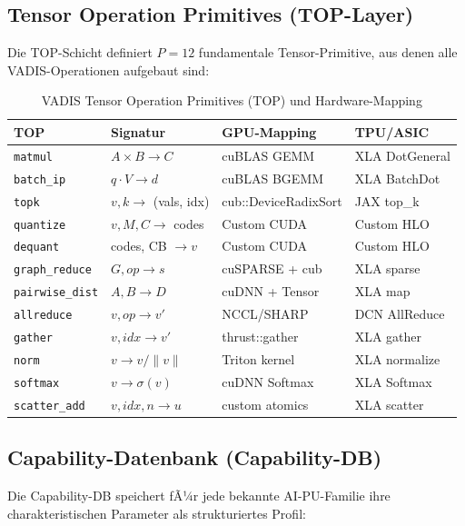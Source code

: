 ﻿\documentclass[12pt,a4paper]{article}
\begin{document}
\subsection{Tensor Operation Primitives (TOP-Layer)}
\label{sub:top_layer}

Die TOP-Schicht definiert $P = 12$ fundamentale Tensor-Primitive,
aus denen alle VADIS-Operationen aufgebaut sind:

\begin{table}[ht]
\centering
\small
\caption{VADIS Tensor Operation Primitives (TOP) und Hardware-Mapping}
\label{tab:top}
\begin{tabular}{@{}p{1.6cm}p{2.4cm}p{2.2cm}p{2.0cm}@{}}
\toprule
\textbf{TOP} & \textbf{Signatur} & \textbf{GPU-Mapping} & \textbf{TPU/ASIC} \\
\midrule
\texttt{matmul} & $A \times B \to C$ & cuBLAS GEMM & XLA DotGeneral \\
\texttt{batch\_ip} & $q \cdot V \to d$ & cuBLAS BGEMM & XLA BatchDot \\
\texttt{topk} & $v, k \to$ (vals, idx) & cub::DeviceRadixSort & JAX top\_k \\
\texttt{quantize} & $v, M, C \to$ codes & Custom CUDA & Custom HLO \\
\texttt{dequant} & codes, CB $\to v$ & Custom CUDA & Custom HLO \\
\texttt{graph\_reduce} & $G, op \to s$ & cuSPARSE + cub & XLA sparse \\
\texttt{pairwise\_dist} & $A, B \to D$ & cuDNN + Tensor & XLA map \\
\texttt{allreduce} & $v, op \to v'$ & NCCL/SHARP & DCN AllReduce \\
\texttt{gather} & $v, idx \to v'$ & thrust::gather & XLA gather \\
\texttt{norm} & $v \to v/\|v\|$ & Triton kernel & XLA normalize \\
\texttt{softmax} & $v \to \sigma(v)$ & cuDNN Softmax & XLA Softmax \\
\texttt{scatter\_add} & $v, idx, n \to u$ & custom atomics & XLA scatter \\
\bottomrule
\end{tabular}
\end{table}

\subsection{Capability-Datenbank (Capability-DB)}
\label{sub:cap_db}

Die Capability-DB speichert fÃ¼r jede bekannte AI-PU-Familie
ihre charakteristischen Parameter als strukturiertes
Profil:
\end{document}
